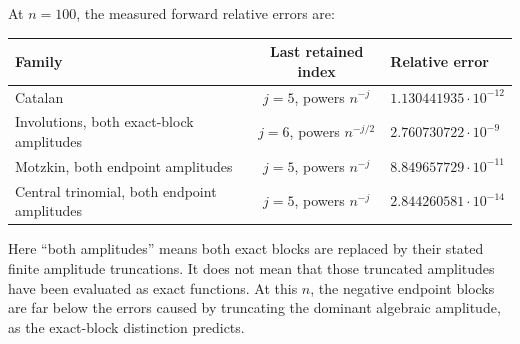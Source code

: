 \documentclass[11pt,openany]{book}
\numberwithin{equation}{chapter}
\theoremstyle{plain}
\theoremstyle{definition}
\theoremstyle{remark}
\begin{document}
At $n=100$, the measured forward relative errors are:
\begin{center}
\small
\begin{tabularx}{\textwidth}{@{}Xcl@{}}
\toprule
Family & Last retained index & Relative error\\
\midrule
Catalan & $j=5$, powers $n^{-j}$ & $1.130441935\cdot10^{-12}$\\
Involutions, both exact-block amplitudes & $j=6$, powers $n^{-j/2}$ & $2.760730722\cdot10^{-9}$\\
Motzkin, both endpoint amplitudes & $j=5$, powers $n^{-j}$ & $8.849657729\cdot10^{-11}$\\
Central trinomial, both endpoint amplitudes & $j=5$, powers $n^{-j}$ & $2.844260581\cdot10^{-14}$\\
\bottomrule
\end{tabularx}
\end{center}
Here ``both amplitudes'' means both exact blocks are replaced by their stated finite amplitude truncations. It does not mean that those truncated amplitudes have been evaluated as exact functions. At this $n$, the negative endpoint blocks are far below the errors caused by truncating the dominant algebraic amplitude, as the exact-block distinction predicts.
\end{document}
